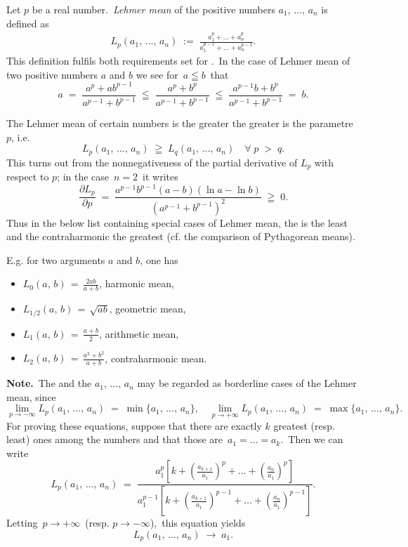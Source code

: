 \documentclass[12pt]{article}
\theoremstyle{definition}
\begin{document}
Let $p$ be a real number.\, \emph{Lehmer mean} of the positive numbers $a_1,\,\ldots,\,a_n$ is defined as
\begin{align}
L_p(a_1,\,\ldots,\,a_n) \;:=\; \frac{a_1^p+\ldots+a_n^p}{a_1^{p-1}+\ldots+a_n^{p-1}}.
\end{align}
This definition fulfils both requirements set for .\, In the case of Lehmer mean of two positive numbers $a$ and $b$ we see for\, $a \leqq b$\, that
$$a \;=\; \frac{a^p\!+\!ab^{p-1}}{a^{p-1}\!+\!b^{p-1}} \;\leqq\; \frac{a^p\!+\!b^p}{a^{p-1}\!+\!b^{p-1}} 
\;\leqq\; \frac{a^{p-1}b\!+\!b^p}{a^{p-1}\!+\!b^{p-1}} \;=\; b.$$


The Lehmer mean of certain numbers is the greater the greater is the parametre $p$, i.e. 
$$L_p(a_1,\,\ldots,\,a_n) \;\geqq\; L_q(a_1,\,\ldots,\,a_n) \quad \forall\; p \;>\; q.$$
This turns out from the nonnegativeness of the partial derivative of $L_p$ with respect to $p$; in the case \,$n =2$\, it writes
$$\frac{\partial L_p}{\partial p} \;=\; \frac{a^{p-1}b^{p-1}(a\!-\!b)(\ln{a}-\ln{b})}{(a^{p-1}\!+\!b^{p-1})^2} 
\;\geqq\; 0.$$
Thus in the below list containing special cases of Lehmer mean, the  is the least and the contraharmonic the greatest (cf. the comparison of Pythagorean means).

E.g. for two arguments $a$ and $b$, one has
\begin{itemize}
\item $\displaystyle L_0(a,\,b) \,=\, \frac{2ab}{a\!+\!b}$, \quad harmonic mean,
\item $\displaystyle L_{1/2}(a,\,b) \,=\, \sqrt{ab}$, \quad geometric mean,
\item $\displaystyle L_1(a,\,b) \,=\, \frac{a\!+\!b}{2}$, \quad arithmetic mean,
\item $\displaystyle L_2(a,\,b) \,=\, \frac{a^2\!+\!b^2}{a\!+\!b}$, \quad contraharmonic mean.
\end{itemize}



\textbf{Note.}\, The  and the  
$a_1,\,\ldots,\,a_n$ may be regarded as borderline cases of the Lehmer mean, since
$$\lim_{p\to-\infty}L_p(a_1,\,\ldots,\,a_n) \;=\; \min\{a_1,\,\ldots,\,a_n\}, \quad 
\lim_{p\to+\infty}L_p(a_1,\,\ldots,\,a_n) \;=\; \max\{a_1,\,\ldots,\,a_n\}.$$
For proving these equations, suppose that there are exactly $k$ greatest (resp. least) ones among the numbers and that those are \,$a_1 = \ldots = a_k$.\, Then we can write
$$L_p(a_1,\,\ldots,\,a_n) \;=\; 
\frac{a_1^p\left[k+\!\left(\frac{a_{k+1}}{a_1}\right)^p\!+\ldots+\!\left(\frac{a_{n}}{a_1}\right)^p\right]}
 {a_1^{p-1}\left[k+\!\left(\frac{a_{k+1}}{a_1}\right)^{p-1}\!+\ldots+\!\left(\frac{a_{n}}{a_1}\right)^{p-1}\right]}.$$
Letting\, $p \to +\infty$\, (resp. $p \to -\infty$),\, this equation yields
$$L_p(a_1,\,\ldots,\,a_n) \;\longrightarrow\; a_1.$$
\end{document}
